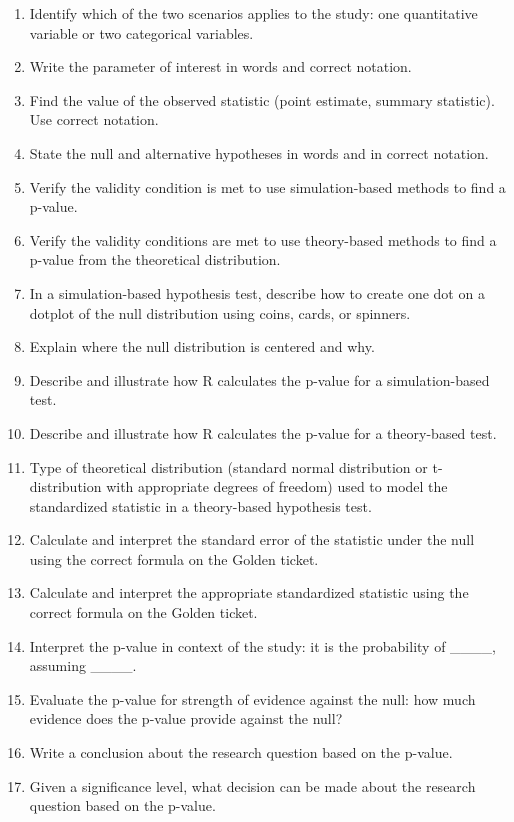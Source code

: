 \documentclass[
]{report}
\begin{document}
\begin{enumerate}
\def\labelenumi{\arabic{enumi}.}
\setcounter{enumi}{7}
\item
  Identify which of the two scenarios applies to the study: one quantitative variable or two categorical variables.
\item
  Write the parameter of interest in words and correct notation.
\item
  Find the value of the observed statistic (point estimate, summary statistic). Use correct notation.
\item
  State the null and alternative hypotheses in words and in correct notation.
\item
  Verify the validity condition is met to use simulation-based methods to find a p-value.
\item
  Verify the validity conditions are met to use theory-based methods to find a p-value from the theoretical distribution.
\item
  In a simulation-based hypothesis test, describe how to create one dot on a dotplot of the null distribution using coins, cards, or spinners.
\item
  Explain where the null distribution is centered and why.
\item
  Describe and illustrate how R calculates the p-value for a simulation-based test.
\item
  Describe and illustrate how R calculates the p-value for a theory-based test.
\item
  Type of theoretical distribution (standard normal distribution or t-distribution with appropriate degrees of freedom) used to model the standardized statistic in a theory-based hypothesis test.
\item
  Calculate and interpret the standard error of the statistic under the null using the correct formula on the Golden ticket.
\item
  Calculate and interpret the appropriate standardized statistic using the correct formula on the Golden ticket.
\item
  Interpret the p-value in context of the study: it is the probability of \_\_\_\_, assuming \_\_\_\_.
\item
  Evaluate the p-value for strength of evidence against the null: how much evidence does the p-value provide against the null?
\item
  Write a conclusion about the research question based on the p-value.
\item
  Given a significance level, what decision can be made about the research question based on the p-value.

\end{enumerate}
\end{document}
